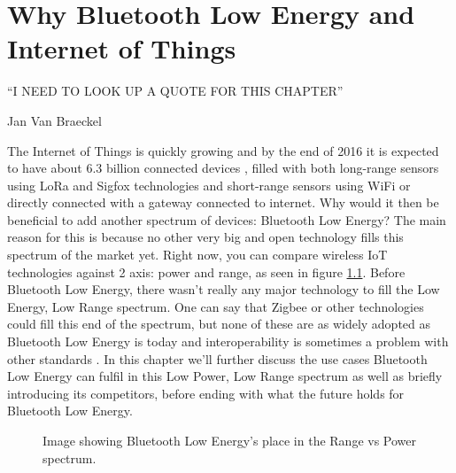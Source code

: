 \documentclass[pdftex,a4paper,12pt,twoside]{report}
\begin{document}
\chapter{Why Bluetooth Low Energy and Internet of Things}
\label{ch:BLEIOT}
\epigraph{``I NEED TO LOOK UP A QUOTE FOR THIS CHAPTER''}{Jan Van Braeckel}
The Internet of Things is quickly growing and by the end of 2016 it is expected to have about 6.3 billion connected devices \citep{gartner2015}, filled with both long-range sensors using LoRa and Sigfox technologies and short-range sensors using WiFi or directly connected with a gateway connected to internet. Why would it then be beneficial to add another spectrum of devices: Bluetooth Low Energy? The main reason for this is because no other very big and open technology fills this spectrum of the market yet. Right now, you can compare wireless IoT technologies against 2 axis: power and range, as seen in figure \ref{fig:powerrange}. Before Bluetooth Low Energy, there wasn't really any major technology to fill the Low Energy, Low Range spectrum. One can say that Zigbee or other technologies could fill this end of the spectrum, but none of these are as widely adopted as Bluetooth Low Energy is today and interoperability is sometimes a problem with other standards \citep{colitti2014}. In this chapter we'll further discuss the use cases Bluetooth Low Energy can fulfil in this Low Power, Low Range spectrum as well as briefly introducing its competitors, before ending with what the future holds for Bluetooth Low Energy.

\begin{figure}[h]
\centering
{} 

\caption{Image showing Bluetooth Low Energy's place in the Range vs Power spectrum.}
\label{fig:powerrange}

\end{figure}
\end{document}
